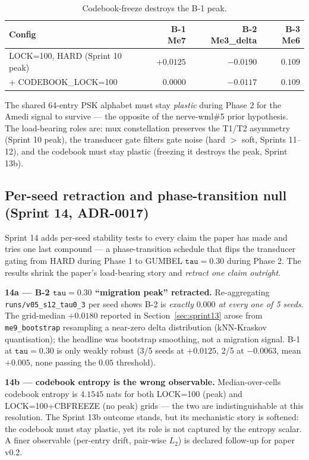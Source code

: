 \documentclass{article}
\begin{document}
\begin{table}[ht]
  \centering
  \caption{Codebook-freeze destroys the B-1 peak.}
  \label{tab:codebook-freeze}
  \begin{tabular}{lrrr}
    \toprule
    Config & B-1 Me7 & B-2 Me3\_delta & B-3 Me6 \\
    \midrule
    LOCK=100, HARD (Sprint 10 peak) & $\mathbf{+0.0125}$ & $-0.0190$ & $0.109$ \\
    + CODEBOOK\_LOCK=100 & $\mathbf{0.0000}$ & $-0.0117$ & $0.109$ \\
    \bottomrule
  \end{tabular}
\end{table}

The shared 64-entry PSK alphabet must stay \emph{plastic} during
Phase 2 for the Amedi signal to survive --- the opposite of the
nerve-wml\#5 prior hypothesis. The load-bearing roles are:
mux constellation preserves the T1/T2 asymmetry (Sprint 10 peak),
the transducer gate filters gate noise (hard $>$ soft,
Sprints 11--12), and the codebook must stay plastic (freezing it
destroys the peak, Sprint 13b).

\subsection{Per-seed retraction and phase-transition null (Sprint 14, ADR-0017)}
\label{sec:sprint14}

Sprint 14 adds per-seed stability tests to every claim the paper
has made and tries one last compound --- a phase-transition
schedule that flips the transducer gating from HARD during Phase 1
to GUMBEL $\mathtt{tau}=0.30$ during Phase 2. The results shrink
the paper's load-bearing story and \emph{retract one claim outright}.

\textbf{14a --- B-2 $\mathtt{tau}=0.30$ ``migration peak''
retracted.} Re-aggregating \texttt{runs/v05\_s12\_tau0\_3} per seed
shows B-2 is \emph{exactly $0.000$ at every one of 5 seeds}.
The grid-median $+0.0180$ reported in
Section~\ref{sec:sprint13} arose from
\texttt{me9\_bootstrap} resampling a near-zero delta distribution
(kNN-Kraskov quantisation); the headline was bootstrap smoothing,
not a migration signal. B-1 at $\mathtt{tau}=0.30$ is only weakly
robust (3/5 seeds at $+0.0125$, 2/5 at $-0.0063$, mean $+0.005$,
none passing the $0.05$ threshold).

\textbf{14b --- codebook entropy is the wrong observable.}
Median-over-cells codebook entropy is $4.1545$ nats for both
LOCK=100 (peak) and LOCK=100+CBFREEZE (no peak) grids --- the two
are indistinguishable at this resolution. The Sprint 13b outcome
stands, but its mechanistic story is softened: the codebook must
stay plastic, yet its role is not captured by the entropy scalar.
A finer observable (per-entry drift, pair-wise $L_2$) is declared
follow-up for paper v0.2.
\end{document}
